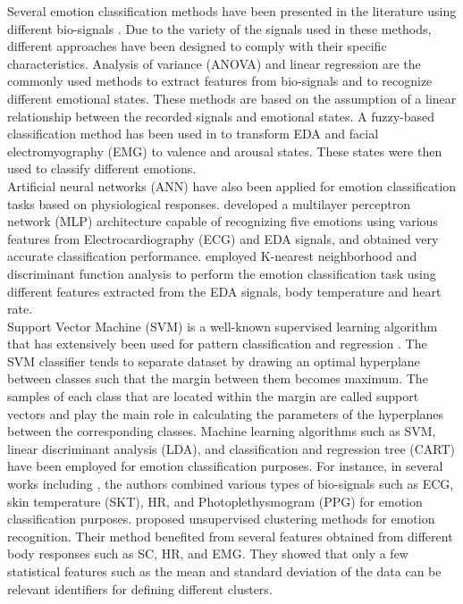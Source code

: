 Several emotion classification methods have been presented in the literature using 
different bio-signals \cite{EmotionInten2014, EmotionResp2013, ElectAct2000, HeteroKnow2016}. 
Due to the variety of the signals used in these methods, 
different approaches have been designed to comply with their specific characteristics. 
Analysis of variance (ANOVA) and linear regression \cite{ElectAct2000} are the 
commonly used methods to extract features from bio-signals and to recognize different 
emotional states. These methods are based on the assumption of a linear relationship 
between the recorded signals and emotional states. A fuzzy-based classification 
method \cite{EmotionInten2014} has been used in to transform EDA and facial 
electromyography (EMG) to valence and arousal states. These states were then used 
to classify different emotions. \\

Artificial neural networks (ANN) have also been applied for emotion classification 
tasks based on physiological responses. \cite{MultPercep2007} developed a multilayer perceptron 
network (MLP) architecture capable of recognizing five emotions using various features 
from Electrocardiography (ECG) and EDA signals, and obtained very accurate classification 
performance. \cite{EmotionRecog2004} employed K-nearest neighborhood and discriminant 
function analysis to perform the emotion classification task using different features 
extracted from the EDA signals, body temperature and heart rate.\\

Support Vector Machine (SVM) is a well-known supervised learning algorithm that has 
extensively been used for pattern classification and regression \cite{SupportVector1995}. 
The SVM classifier tends to separate dataset by drawing an optimal hyperplane 
between classes such that the margin between them becomes maximum. The samples of 
each class that are located within the margin are called support vectors and play the 
main role in calculating the parameters of the hyperplanes between the corresponding 
classes. Machine learning algorithms such as SVM, linear discriminant analysis (LDA), 
and classification and regression tree (CART) have been employed for emotion 
classification purposes. For instance, in several works including \cite{Taxonomy2011, EmotionClassifi2014}, 
the authors combined various types of bio-signals such as ECG, 
skin temperature (SKT), HR, and Photoplethysmogram (PPG) for  emotion classification 
purposes. \cite{FeatureSelection2006} proposed unsupervised clustering methods for emotion 
recognition. Their method benefited from several features obtained from different 
body responses such as SC, HR, and EMG. They showed that only a few statistical 
features such as the mean and standard deviation of the data can be relevant identifiers 
for defining different clusters. \\

